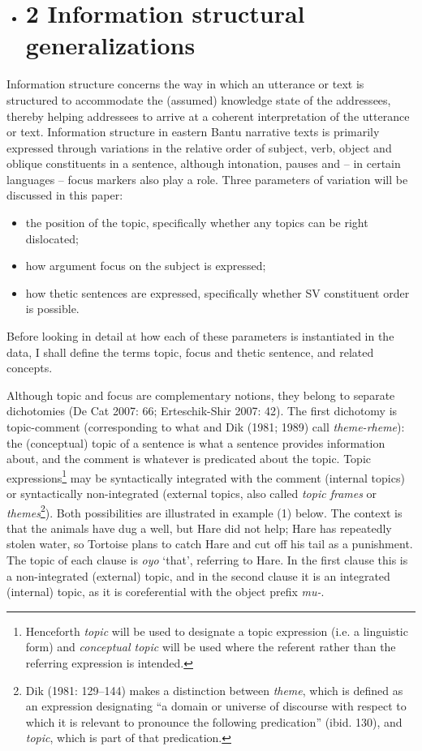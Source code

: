 \documentclass[output=paper]{langsci/langscibook}
\begin{document}
\begin{itemize}
\item \section{2  Information structural generalizations}\end{itemize}

Information structure concerns the way in which an utterance or text is structured to accommodate the (assumed) knowledge state of the addressees, thereby helping addressees to arrive at a coherent interpretation of the utterance or text. Information structure in eastern Bantu narrative texts is primarily expressed through variations in the relative order of subject, verb, object and oblique constituents in a sentence, although intonation, pauses and – in certain languages – focus markers also play a role. Three parameters of variation will be discussed in this paper:

\begin{itemize}
\item the position of the topic, specifically whether any topics can be right dislocated;
\item how argument focus on the subject is expressed;
\item how thetic sentences are expressed, specifically whether SV constituent order is possible.
\end{itemize}

Before looking in detail at how each of these parameters is instantiated in the data, I shall define the terms topic, focus and thetic sentence, and related concepts.

Although topic and focus are complementary notions, they belong to separate dichotomies (De Cat 2007: 66; Erteschik-Shir 2007: 42). The first dichotomy is topic-comment (corresponding to what \citet{Halliday1967} and Dik (1981; 1989) call \textit{theme-rheme}): the (conceptual) topic of a sentence is what a sentence provides information about, and the comment is whatever is predicated about the topic. Topic expressions\footnote{Henceforth \textit{topic} will be used to designate a topic expression (i.e. a linguistic form) and \textit{conceptual topic} will be used where the referent rather than the referring expression is intended.} may be syntactically integrated with the comment (internal topics) or syntactically non-integrated (external topics, also called \textit{topic frames} or \textit{themes}\footnote{Dik (1981: 129–144) makes a distinction between \textit{theme}, which is defined as an expression designating “a domain or universe of discourse with respect to which it is relevant to pronounce the following predication” (ibid. 130), and \textit{topic}, which is part of that predication.}). Both possibilities are illustrated in example (1) below. The context is that the animals have dug a well, but Hare did not help; Hare has repeatedly stolen water, so Tortoise plans to catch Hare and cut off his tail as a punishment. The topic of each clause is \emph{oyo} ‘that’, referring to Hare. In the first clause this is a non-integrated (external) topic, and in the second clause it is an integrated (internal) topic, as it is coreferential with the object prefix \emph{mu}\emph{\nobreakdash-}.
\end{document}
